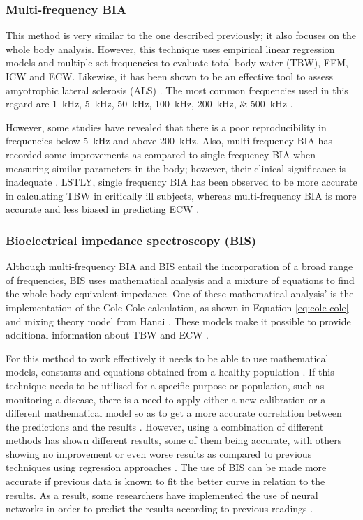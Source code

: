 \subsubsection{Multi-frequency BIA}
This method is very similar to the one described previously; it also focuses on the whole body analysis. However, this technique uses empirical linear regression models and multiple set frequencies to evaluate total body water (TBW), FFM, ICW and ECW. Likewise, it has been shown to be an effective tool to assess amyotrophic lateral sclerosis (ALS) \cite{wang2011electrical}. The most common frequencies used in this regard are \SIlist{1;5;50;100;200;500}{\kilo\hertz} \cite{kyle2004bioelectrical}. 

However, some studies have revealed that there is a poor reproducibility in frequencies below \SI{5}{\kilo\hertz} and above \SI{200}{\kilo\hertz}. Also, multi-frequency BIA has recorded some improvements as compared to single frequency BIA when measuring similar parameters in the body; however, their clinical significance is inadequate \cite{hannan1995comparison}. LSTLY, single frequency BIA has been observed to be more accurate in calculating TBW in critically ill subjects, whereas multi-frequency BIA is more accurate and less biased in predicting ECW \cite{patel1996estimation}. 

\subsubsection{Bioelectrical impedance spectroscopy (BIS)}
Although multi-frequency BIA and BIS entail the incorporation of a broad range of frequencies, BIS uses mathematical analysis and a mixture of equations to find the whole body equivalent impedance. One of these mathematical analysis' is the implementation of the Cole-Cole \cite{cole1941dispersion} calculation, as shown in Equation \ref{eq:cole cole} and mixing theory model from Hanai \cite{hanai1968electrical}. These models make it possible to provide additional information about TBW and ECW \cite{hanai1968electrical}. 

For this method to work effectively it needs to be able to use mathematical models, constants and equations obtained from a healthy population \cite{patel1994estimation}. If this technique needs to be utilised for a specific purpose or population, such as monitoring a disease, there is a need to apply either a new calibration or a different mathematical model so as to get a more accurate correlation between the predictions and the results \cite{schoeller2000bioelectrical, de1997predicting}. However, using a combination of different methods has shown different results, some of them being accurate, with others showing no improvement or even worse results as compared to previous techniques using regression approaches \cite{kyle2004bioelectrical}. The use of BIS can be made more accurate if previous data is known to fit the better curve in relation to the results. As a result, some researchers have implemented the use of neural networks in order to predict the results according to previous readings \cite{songer2001tissue,kun2003algorithm}. 

